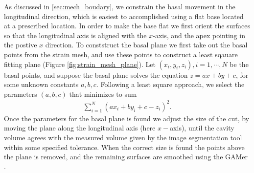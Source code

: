 As discussed in \ref{sec:mech_boudary}, we constrain the basal movement in
the longitudinal direction, which is easiest to accomplished using a flat
base located at a prescribed location. In order to make the base flat
we first orient the surfaces so that the longitudinal axis is aligned
with the $x$-axis, and the apex pointing in the postive $x$
direction. To conststruct the basal plane we first take out the basal
points from the strain mesh, and use these points to construct a least
sqauare fitting plane (Figure \ref{fig:strain_mesh_plane}). Let $(x_i, y_i, z_i), i = 1, \cdots, N$
be the basal points, and suppose the basal plane solves the equation
$z = ax + by + c$, for some unknown constants $a,b,c$. Following a
least square approach, we select the parameters $(a,b,c)$ that
minimizes to sum
\begin{align}
  \sum_{i = 1}^{N} \left(ax_i + by_i + c  - z_i \right)^2.
\end{align}
Once the parameters for the basal plane is found we adjust the size of
the cut, by moving the plane along the longitudinal axis (here
$x-$axis), until the cavity volume agrees with the measured volume
given by the image segmentation tool within some specified tolerance. 
When the correct size is found the points above the plane is removed,
and the remaining surfaces are smoothed using the GAMer
\cite{yu2008feature}.

